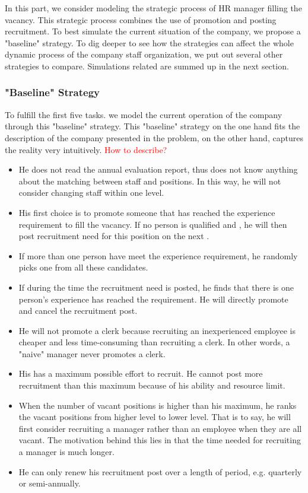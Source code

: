 \documentclass[tcn = 37075, sheet = true, abstract = true]{mcmthesis}
\begin{document}
In this part, we consider modeling the strategic process of HR manager filling the vacancy. This strategic process combines the use of promotion and posting recruitment. To best simulate the current situation of the company, we propose a "baseline" strategy. To dig deeper to see how the strategies can affect the whole dynamic process of the company staff organization, we put out several other strategies to compare. Simulations related are summed up in the next section.


\subsubsection{"Baseline" Strategy}

To fulfill the first five tasks. we model the current operation of the company through this "baseline" strategy. This "baseline" strategy on the one hand fits the description of the company presented in the problem, on the other hand, captures the reality very intuitively. \textcolor{red}{How to describe?}
\begin{itemize}
\item He does not read the annual evaluation report, thus does not know anything about the matching between staff and positions. In this way, he will not consider changing staff within one level.
\item His first choice is to promote someone that has reached the experience requirement to fill the vacancy. If no person is qualified and , he will then post recruitment need for this position on the next .
\item If more than one person have meet the experience requirement, he randomly picks one from all these candidates.
\item If during the time the recruitment need is posted, he finds that there is one person's experience has reached the requirement. He will directly promote and cancel the recruitment post.
\item He will not promote a clerk because recruiting an inexperienced employee is cheaper and less time-consuming than recruiting a clerk. In other words, a "naive" manager never promotes a clerk.
\item His has a maximum possible effort to recruit. He cannot post more recruitment than this maximum because of his ability and resource limit. 
\item When the number of vacant positions is higher than his maximum, he ranks the vacant positions from higher level to lower level. That is to say, he will first consider recruiting a manager rather than an employee when they are all vacant. The motivation behind this lies in that the time needed for recruiting a manager is much longer.
\item He can only renew his recruitment post over a length of period, e.g. quarterly or semi-annually.
\end{itemize}
\end{document}
